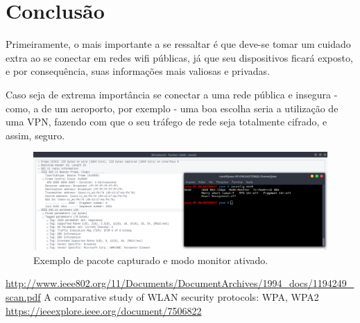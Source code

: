 \documentclass[journal]{IEEEtran}
\begin{document}
\section{Conclusão}
Primeiramente, o mais importante a se ressaltar é que deve-se tomar um cuidado extra ao se conectar em redes wifi públicas, já que seu dispositivos ficará exposto, e por consequência, suas informações mais valiosas e privadas. \par
Caso seja de extrema importância se conectar a uma rede pública e insegura - como, a de um aeroporto, por exemplo - uma boa escolha seria a utilização de uma VPN, fazendo com que o seu tráfego de rede seja totalmente cifrado, e assim, seguro.\par

\begin{figure}[t!]
	\includegraphics[width=\linewidth]{../pictures/monitor_mode_packet.png}
	\caption{Exemplo de pacote capturado e modo monitor ativado.}
	\label{fig:packet}
\end{figure}

\begin{thebibliography}{1}

\url{http://www.ieee802.org/11/Documents/DocumentArchives/1994_docs/1194249_scan.pdf}
A comparative study of WLAN security protocols: WPA, WPA2 \\
\url{https://ieeexplore.ieee.org/document/7506822}



\end{thebibliography}
\end{document}
